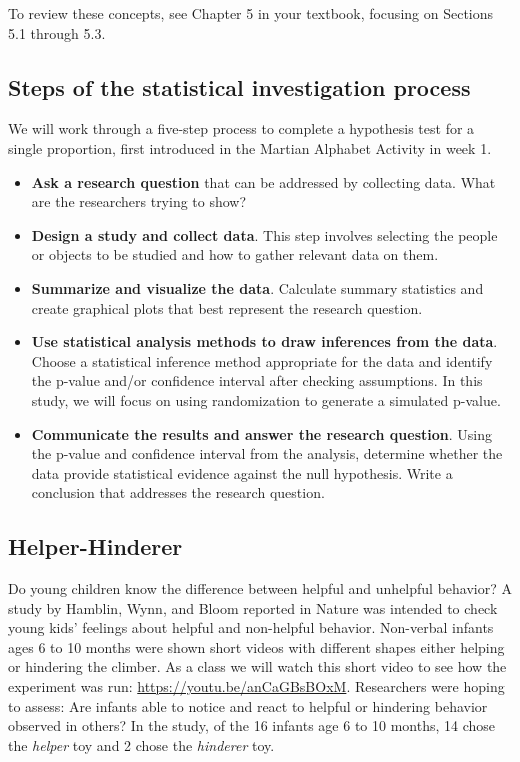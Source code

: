 \documentclass[
]{report}
\begin{document}
To review these concepts, see Chapter 5 in your textbook, focusing on Sections 5.1 through 5.3.

\hypertarget{steps-of-the-statistical-investigation-process-1}{%
\subsection{Steps of the statistical investigation process}\label{steps-of-the-statistical-investigation-process-1}}

We will work through a five-step process to complete a hypothesis test for a single proportion, first introduced in the Martian Alphabet Activity in week 1.

\begin{itemize}
\item
  \textbf{Ask a research question} that can be addressed by collecting data. What are the researchers trying to show?
\item
  \textbf{Design a study and collect data}. This step involves selecting the people or objects to be studied and how to gather relevant data on them.
\item
  \textbf{Summarize and visualize the data}. Calculate summary statistics and create graphical plots that best represent the research question.
\item
  \textbf{Use statistical analysis methods to draw inferences from the data}. Choose a statistical inference method appropriate for the data and identify the p-value and/or confidence interval after checking assumptions. In this study, we will focus on using randomization to generate a simulated p-value.
\item
  \textbf{Communicate the results and answer the research question}. Using the p-value and confidence interval from the analysis, determine whether the data provide statistical evidence against the null hypothesis. Write a conclusion that addresses the research question.
\end{itemize}

\newpage

\hypertarget{helper-hinderer}{%
\subsection{Helper-Hinderer}\label{helper-hinderer}}

Do young children know the difference between helpful and unhelpful behavior? A study by Hamblin, Wynn, and Bloom reported in Nature was intended to check young kids' feelings about helpful and non-helpful behavior. Non-verbal infants ages 6 to 10 months were shown short videos with different shapes either helping or hindering the climber. As a class we will watch this short video to see how the experiment was run: \url{https://youtu.be/anCaGBsBOxM}. Researchers were hoping to assess: Are infants able to notice and react to helpful or hindering behavior observed in others? In the study, of the 16 infants age 6 to 10 months, 14 chose the \emph{helper} toy and 2 chose the \emph{hinderer} toy.
\end{document}
